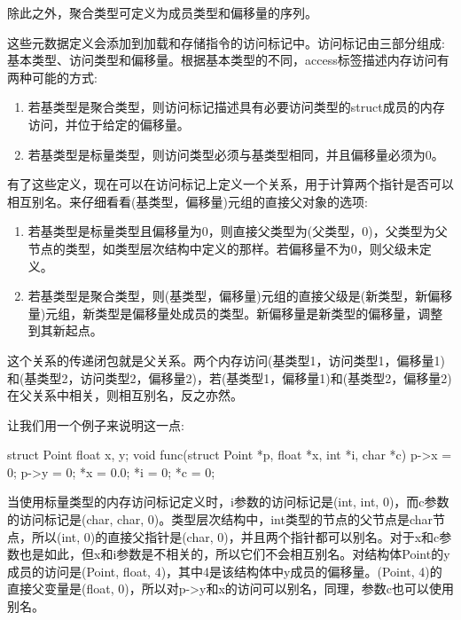 除此之外，聚合类型可定义为成员类型和偏移量的序列。

这些元数据定义会添加到加载和存储指令的访问标记中。访问标记由三部分组成:基本类型、访问类型和偏移量。根据基本类型的不同，access标签描述内存访问有两种可能的方式:

\begin{enumerate}
\item
若基类型是聚合类型，则访问标记描述具有必要访问类型的struct成员的内存访问，并位于给定的偏移量。

\item
若基类型是标量类型，则访问类型必须与基类型相同，并且偏移量必须为0。
\end{enumerate}

有了这些定义，现在可以在访问标记上定义一个关系，用于计算两个指针是否可以相互别名。来仔细看看(基类型，偏移量)元组的直接父对象的选项:

\begin{enumerate}
\item
若基类型是标量类型且偏移量为0，则直接父类型为(父类型，0)，父类型为父节点的类型，如类型层次结构中定义的那样。若偏移量不为0，则父级未定义。

\item
若基类型是聚合类型，则(基类型，偏移量)元组的直接父级是(新类型，新偏移量)元组，新类型是偏移量处成员的类型。新偏移量是新类型的偏移量，调整到其新起点。
\end{enumerate}

这个关系的传递闭包就是父关系。两个内存访问(基类型1，访问类型1，偏移量1)和(基类型2，访问类型2，偏移量2)，若(基类型1，偏移量1)和(基类型2，偏移量2)在父关系中相关，则相互别名，反之亦然。

让我们用一个例子来说明这一点:

\begin{cpp}
struct Point { float x, y; }
void func(struct Point *p, float *x, int *i, char *c) {
    p->x = 0; p->y = 0; *x = 0.0; *i = 0; *c = 0;
}
\end{cpp}

当使用标量类型的内存访问标记定义时，i参数的访问标记是(int, int, 0)，而c参数的访问标记是(char, char, 0)。类型层次结构中，int类型的节点的父节点是char节点，所以(int, 0)的直接父指针是(char, 0)，并且两个指针都可以别名。对于x和c参数也是如此，但x和i参数是不相关的，所以它们不会相互别名。对结构体Point的y成员的访问是(Point, float, 4)，其中4是该结构体中y成员的偏移量。(Point, 4)的直接父变量是(float, 0)，所以对p->y和x的访问可以别名，同理，参数c也可以使用别名。



